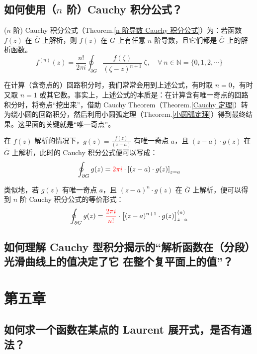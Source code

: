 \documentclass[UTF8]{report}
\def\N{\mathbb{N}}
\theoremstyle{MyLineTheoremStyle} %
\theoremstyle{MyBlockTheoremStyle} %
\theoremstyle{MySubsubsectionStyle} %
\begin{document}
\subsection{如何使用（$n$ 阶）Cauchy 积分公式？}

($n$ 阶) Cauchy 积分公式（Theorem.\ref{n 阶导数 Cauchy 积分公式}）为：若函数 $f(z)$ 在 $\overline{G}$ 上解析，则 $f(z)$ 在 $G$ 上有任意 $n$ 阶导数，且它们都是 $\overline{G}$ 上的解析函数。
\begin{equation}
f^{(n)}(z) = \frac{n !}{2\pi i} \oint_{\partial G} \frac{f(\zeta)}{(\zeta - z )^{n+1}} \ \mathrm{\zeta},\quad \forall\ n \in \N = \{0, 1, 2, \cdots\}
\end{equation}

在计算（含奇点的）回路积分时，我们常常会用到上述公式，有时取 $n = 0$，有时又取 $n =1$ 或其它数。事实上，上述公式的本质是：在计算含有唯一奇点的回路积分时，将奇点“挖出来”，借助 Cauchy Theorem（Theorem.\ref{Cauchy 定理}）转为绕小圆的回路积分，然后利用小圆弧定理（Theorem.\ref{小圆弧定理}）得到最终结果。这里面的关键就是“唯一奇点”。

在 $f(z)$ 解析的情况下，$g(z) = \frac{f(z)}{(z - a)}$ 有唯一奇点 $a$，且 $(z - a)\cdot g(z) $ 在 $\overline{G}$ 上解析，此时的 Cauchy 积分公式便可以写成：
\begin{equation}
\oint_{\partial G} g(z) = {\color{red} 2\pi i }\cdot \left[ (z - a)\cdot g(z) \right]_{z = a}
\end{equation}

类似地，若 $g(z)$ 有唯一奇点 $a$，且 $(z - a)^n\cdot g(z) $ 在 $\overline{G}$ 上解析，便可以得到 $n$ 阶 Cauchy 积分公式的等价形式：
\begin{equation}
    \oint_{\partial G} g(z) = {\color{red} \frac{2\pi i}{n!}} \cdot \left[ (z - a)^{n+1}\cdot g(z) \right]^{(n)}_{z = a}
\end{equation}

\subsection{如何理解 Cauchy 型积分揭示的“解析函数在（分段）光滑曲线上的值决定了它 在整个复平面上的值”？}

\section{第五章}

\subsection{如何求一个函数在某点的 Laurent 展开式，是否有通法？}
\end{document}
